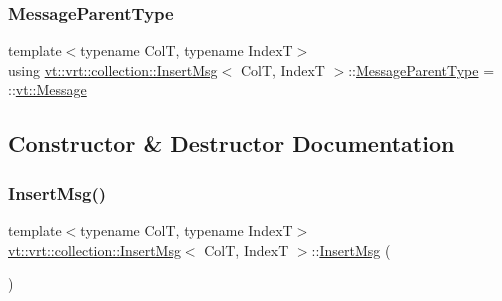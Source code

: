 \subsubsection{\texorpdfstring{Message\+Parent\+Type}{MessageParentType}}
{\footnotesize\ttfamily template$<$typename ColT, typename IndexT$>$ \\
using \hyperlink{structvt_1_1vrt_1_1collection_1_1_insert_msg}{vt\+::vrt\+::collection\+::\+Insert\+Msg}$<$ ColT, IndexT $>$\+::\hyperlink{structvt_1_1messaging_1_1_active_msg_ac2e6d93267991027ce78c968b17064c7}{Message\+Parent\+Type} =  \+::\hyperlink{namespacevt_a3a3ddfef40b4c90915fa43cdd5f129ea}{vt\+::\+Message}}



\subsection{Constructor \& Destructor Documentation}
\mbox{\label{structvt_1_1vrt_1_1collection_1_1_insert_msg_a44aed2e193e9972e28eb9c757cfe4e0b}} 
\subsubsection{\texorpdfstring{Insert\+Msg()}{InsertMsg()}\hspace{0.1cm}{\footnotesize\ttfamily [1/2]}}
{\footnotesize\ttfamily template$<$typename ColT, typename IndexT$>$ \\
\hyperlink{structvt_1_1vrt_1_1collection_1_1_insert_msg}{vt\+::vrt\+::collection\+::\+Insert\+Msg}$<$ ColT, IndexT $>$\+::\hyperlink{structvt_1_1vrt_1_1collection_1_1_insert_msg}{Insert\+Msg} (\begin{DoxyParamCaption}{ }\end{DoxyParamCaption})\hspace{0.3cm}{\ttfamily [default]}}

\mbox{\label{structvt_1_1vrt_1_1collection_1_1_insert_msg_a56b81ce822e935c00a7419734844d288}} 
